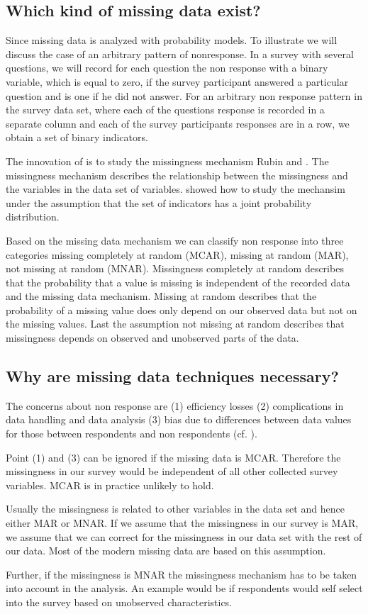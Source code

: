 \subsection{Which kind of missing data exist?} 
Since \cite{rubin1976} missing data is analyzed with probability models. 
To illustrate we will discuss the case of an arbitrary pattern of nonresponse.
In a survey with several questions, we will record for each question the non response with a binary variable, which is equal to zero, if the survey participant answered a particular question and is one if he did not answer. 
For an arbitrary non response pattern in the survey data set, where each of the questions response is recorded in a separate column and each of the survey participants responses are in a row, we obtain a set of binary indicators. \par 
The innovation of \cite{rubin1976} is to study the missingness mechanism Rubin and \cite{Little}. The missingness mechanism describes the relationship between the missingness and the variables in the data set of variables. \cite{rubin1976} showed how to study the mechansim under the assumption that the set of indicators has a joint probability distribution. \par
Based on the missing data mechanism we can classify non response into three categories missing completely at random (MCAR), missing at random (MAR), not missing at random (MNAR).  Missingness completely at random describes that the probability that a value is missing is independent of the recorded data and the missing data mechanism. 
Missing at random describes that the probability of a missing value does only depend on our observed data but not on the missing values. 
Last the assumption not missing at random describes that missingness depends on observed and unobserved parts of the data. \par

\subsection{Why are missing data techniques necessary?}

The concerns about non response are (1) efficiency losses (2) complications in data handling and data analysis (3) bias due to differences between data values for those between respondents and non respondents  (cf. \cite{Schafer99}). \par 
Point (1) and (3)  can be ignored if the missing data is MCAR. 
Therefore the missingness in our survey would be independent of all other collected survey variables. MCAR is in practice unlikely to hold. \par 
Usually the missingness is related to other variables in the data set and hence either MAR or MNAR. 
If we assume that the missingness in our survey is  MAR, we assume that we can correct for the missingness in our data set with the rest of our data.  Most of the modern missing data are based on this assumption. \par
Further, if the missingness is MNAR the missingness mechanism has to be taken into account in the analysis. An example would be if respondents would self select into the survey based on unobserved characteristics. 

